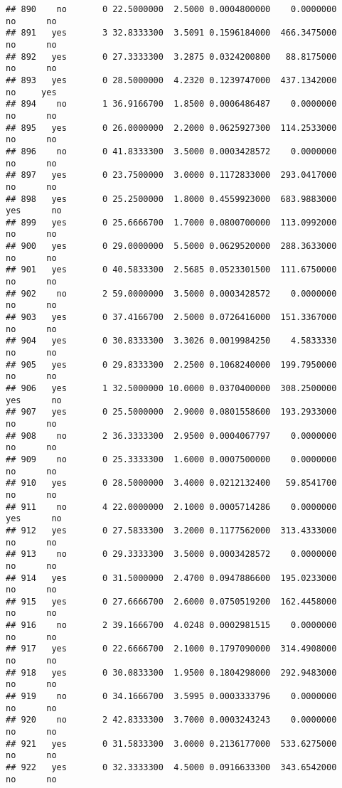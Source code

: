 \documentclass[]{article}
\begin{document}
\begin{verbatim}
## 890    no       0 22.5000000  2.5000 0.0004800000    0.0000000    no      no
## 891   yes       3 32.8333300  3.5091 0.1596184000  466.3475000    no      no
## 892   yes       0 27.3333300  3.2875 0.0324200800   88.8175000    no      no
## 893   yes       0 28.5000000  4.2320 0.1239747000  437.1342000    no     yes
## 894    no       1 36.9166700  1.8500 0.0006486487    0.0000000    no      no
## 895   yes       0 26.0000000  2.2000 0.0625927300  114.2533000    no      no
## 896    no       0 41.8333300  3.5000 0.0003428572    0.0000000    no      no
## 897   yes       0 23.7500000  3.0000 0.1172833000  293.0417000    no      no
## 898   yes       0 25.2500000  1.8000 0.4559923000  683.9883000   yes      no
## 899   yes       0 25.6666700  1.7000 0.0800700000  113.0992000    no      no
## 900   yes       0 29.0000000  5.5000 0.0629520000  288.3633000    no      no
## 901   yes       0 40.5833300  2.5685 0.0523301500  111.6750000    no      no
## 902    no       2 59.0000000  3.5000 0.0003428572    0.0000000    no      no
## 903   yes       0 37.4166700  2.5000 0.0726416000  151.3367000    no      no
## 904   yes       0 30.8333300  3.3026 0.0019984250    4.5833330    no      no
## 905   yes       0 29.8333300  2.2500 0.1068240000  199.7950000    no      no
## 906   yes       1 32.5000000 10.0000 0.0370400000  308.2500000   yes      no
## 907   yes       0 25.5000000  2.9000 0.0801558600  193.2933000    no      no
## 908    no       2 36.3333300  2.9500 0.0004067797    0.0000000    no      no
## 909    no       0 25.3333300  1.6000 0.0007500000    0.0000000    no      no
## 910   yes       0 28.5000000  3.4000 0.0212132400   59.8541700    no      no
## 911    no       4 22.0000000  2.1000 0.0005714286    0.0000000   yes      no
## 912   yes       0 27.5833300  3.2000 0.1177562000  313.4333000    no      no
## 913    no       0 29.3333300  3.5000 0.0003428572    0.0000000    no      no
## 914   yes       0 31.5000000  2.4700 0.0947886600  195.0233000    no      no
## 915   yes       0 27.6666700  2.6000 0.0750519200  162.4458000    no      no
## 916    no       2 39.1666700  4.0248 0.0002981515    0.0000000    no      no
## 917   yes       0 22.6666700  2.1000 0.1797090000  314.4908000    no      no
## 918   yes       0 30.0833300  1.9500 0.1804298000  292.9483000    no      no
## 919    no       0 34.1666700  3.5995 0.0003333796    0.0000000    no      no
## 920    no       2 42.8333300  3.7000 0.0003243243    0.0000000    no      no
## 921   yes       0 31.5833300  3.0000 0.2136177000  533.6275000    no      no
## 922   yes       0 32.3333300  4.5000 0.0916633300  343.6542000    no      no

\end{verbatim}
\end{document}
